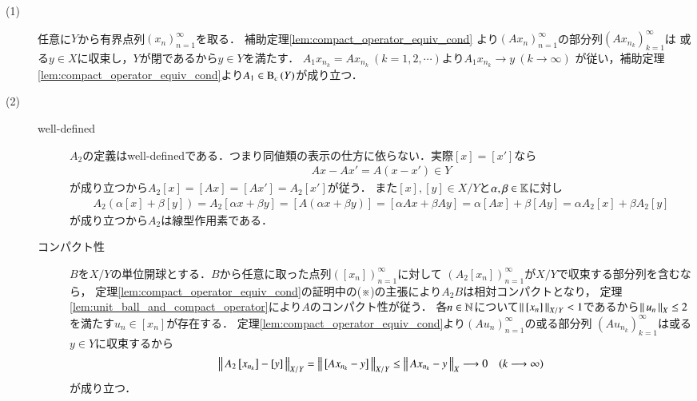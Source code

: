	\begin{prf}\mbox{}
		\begin{description}
			\item[(1)] 任意に$Y$から有界点列$(x_n)_{n=1}^{\infty}$を取る．
				補助定理\ref{lem:compact_operator_equiv_cond}
				より$(A x_n)_{n=1}^{\infty}$の部分列$\left( A x_{n_k} \right)_{k=1}^{\infty}$は
				或る$y \in X$に収束し，$Y$が閉であるから$y \in Y$を満たす．
				$A_1 x_{n_k} = A x_{n_k}\ (k=1,2,\cdots)$より$A_1 x_{n_k} \longrightarrow y\ (k \longrightarrow \infty)$
				が従い，補助定理\ref{lem:compact_operator_equiv_cond}より$A_1 \in \mathrm{B}_c\left(Y\right) $が成り立つ．
				
			\item[(2)]
				\begin{description}
					\item[well-defined] $A_2$の定義はwell-definedである．つまり同値類の表示の仕方に依らない．実際$[x] = [x']$なら
						\begin{align}
							A x - A x' = A(x - x') \in Y
						\end{align}
						が成り立つから$A_2[x] = [Ax] = [Ax'] = A_2[x']$が従う．
						また$[x],[y] \in X/Y$と$\alpha,\beta \in \mathbb{K}$に対し
						\begin{align}
							A_2(\alpha[x] + \beta[y]) = A_2[\alpha x + \beta y] 
							= [A(\alpha x + \beta y)] = [\alpha A x + \beta A y] = \alpha [Ax] + \beta [Ay] = \alpha A_2[x] + \beta A_2[y]
						\end{align}
						が成り立つから$A_2$は線型作用素である．
						
					\item[コンパクト性]
						$B$を$X/Y$の単位開球とする．$B$から任意に取った点列$\left( [x_n] \right)_{n=1}^{\infty}$に対して
						$\left( A_2[x_n] \right)_{n=1}^{\infty}$が$X/Y$で収束する部分列を含むなら，
						定理\ref{lem:compact_operator_equiv_cond}の証明中の(※)の主張により$A_2 B$は相対コンパクトとなり，
						定理\ref{lem:unit_ball_and_compact_operator}により$A$のコンパクト性が従う．
						各$n \in \mathbb{N}$について$\left\|\, [x_n]\, \right\|_{X/Y} < 1$であるから$\left\|\, u_n\, \right\|_{X} \leq 2$を満たす$u_n \in [x_n]$が存在する．
						定理\ref{lem:compact_operator_equiv_cond}より$(A u_n)_{n=1}^{\infty}$の或る部分列
						$\left( A u_{n_k} \right)_{k=1}^{\infty}$は或る$y \in Y$に収束するから
						\begin{align}
							\left\|\, A_2 \left[x_{n_k}\right] - [y]\, \right\|_{X/Y} = \left\|\, \left[ A x_{n_k} - y \right]\, \right\|_{X/Y} 
							\leq \left\|\, A x_{n_k} - y\, \right\|_{X} \longrightarrow 0 \quad (k \longrightarrow \infty)
						\end{align}
						が成り立つ．
						\QED
				\end{description}
		\end{description}
	\end{prf}
	
